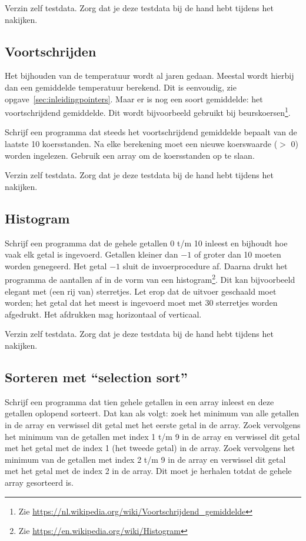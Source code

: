 \documentclass[a4paper,10pt,fleqn,twoside]{article}
\begin{document}
Verzin zelf testdata. Zorg dat je deze testdata bij de hand hebt tijdens het nakijken.

\subsection{Voortschrijden}
Het bijhouden van de temperatuur wordt al jaren gedaan. Meestal wordt hierbij dan een gemiddelde temperatuur berekend. Dit is eenvoudig, zie opgave~\ref{sec:inleidingpointers}. Maar er is nog een soort gemiddelde: het voortschrijdend gemiddelde. Dit wordt bijvoorbeeld gebruikt bij beurskoersen\footnote{Zie \url{https://nl.wikipedia.org/wiki/Voortschrijdend_gemiddelde}}.

Schrijf een programma dat steeds het voortschrijdend gemiddelde bepaalt van de laatste 10 koersstanden. Na elke berekening moet een nieuwe koerswaarde ($>$ 0) worden ingelezen. Gebruik een array om de koersstanden op te slaan.

Verzin zelf testdata. Zorg dat je deze testdata bij de hand hebt tijdens het nakijken.

\subsection{Histogram}
Schrijf een programma dat de gehele getallen 0 t/m 10 inleest en bijhoudt hoe vaak elk getal is ingevoerd. Getallen kleiner dan $-1$ of groter dan 10 moeten worden genegeerd. Het getal $-1$ sluit de invoerprocedure af. Daarna drukt het programma de aantallen af in de vorm van een histogram\footnote{Zie \url{https://en.wikipedia.org/wiki/Histogram}}. Dit kan bijvoorbeeld elegant met (een rij van) sterretjes. Let erop dat de uitvoer geschaald moet worden; het getal dat het meest is ingevoerd moet met 30 sterretjes worden afgedrukt. Het afdrukken mag horizontaal of verticaal.

Verzin zelf testdata. Zorg dat je deze testdata bij de hand hebt tijdens het nakijken.

\subsection{Sorteren met ``selection sort''}
Schrijf een programma dat tien gehele getallen in een array inleest en deze getallen oplopend sorteert. Dat kan als volgt: zoek het minimum van alle getallen in de array en verwissel dit getal met het eerste getal in de array. Zoek vervolgens het minimum van de getallen met index 1 t/m 9 in de array en verwissel dit getal met het getal met de index 1 (het tweede getal) in de array. Zoek vervolgens het minimum van de getallen met index 2 t/m 9 in de array en verwissel dit getal met het getal met de index 2 in de array. Dit moet je herhalen totdat de gehele array gesorteerd is.
\end{document}
